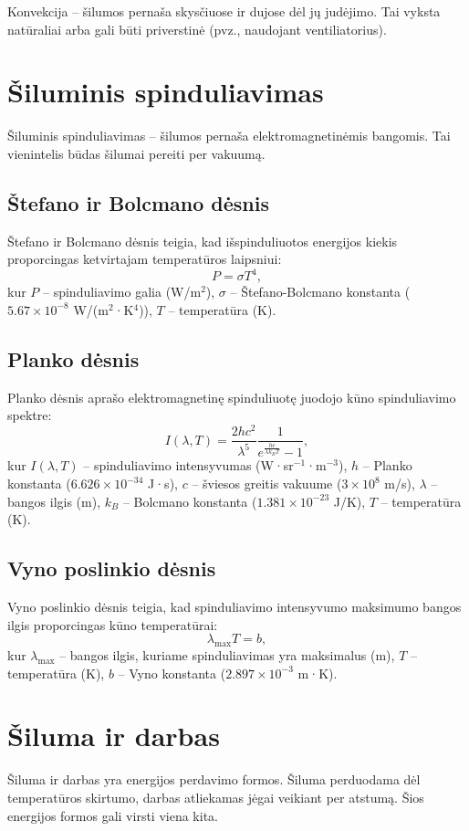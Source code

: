 \documentclass[a4paper,12pt]{article}
\begin{document}
Konvekcija – šilumos pernaša skysčiuose ir dujose dėl jų judėjimo. Tai vyksta natūraliai arba gali būti priverstinė (pvz., naudojant ventiliatorius).

\section{Šiluminis spinduliavimas}

Šiluminis spinduliavimas – šilumos pernaša elektromagnetinėmis bangomis. Tai vienintelis būdas šilumai pereiti per vakuumą.

\subsection{Štefano ir Bolcmano dėsnis}
Štefano ir Bolcmano dėsnis teigia, kad išspinduliuotos energijos kiekis proporcingas ketvirtajam temperatūros laipsniui:
\[
P = \sigma T^4,
\]
kur $P$ – spinduliavimo galia (W/m\(^2\)), $\sigma$ – Štefano-Bolcmano konstanta ($5.67 \times 10^{-8}$ W/(m\(^2\)·K\(^4\))), $T$ – temperatūra (K).

\subsection{Planko dėsnis}
Planko dėsnis aprašo elektromagnetinę spinduliuotę juodojo kūno spinduliavimo spektre:
\[
I(\lambda, T) = \frac{2hc^2}{\lambda^5} \frac{1}{e^{\frac{hc}{\lambda k_B T}} - 1},
\]
kur $I(\lambda, T)$ – spinduliavimo intensyvumas (W·sr\(^{-1}\)·m\(^{-3}\)), $h$ – Planko konstanta ($6.626 \times 10^{-34}$ J·s), $c$ – šviesos greitis vakuume ($3 \times 10^8$ m/s), $\lambda$ – bangos ilgis (m), $k_B$ – Bolcmano konstanta ($1.381 \times 10^{-23}$ J/K), $T$ – temperatūra (K).

\subsection{Vyno poslinkio dėsnis}
Vyno poslinkio dėsnis teigia, kad spinduliavimo intensyvumo maksimumo bangos ilgis proporcingas kūno temperatūrai:
\[
\lambda_{\text{max}} T = b,
\]
kur $\lambda_{\text{max}}$ – bangos ilgis, kuriame spinduliavimas yra maksimalus (m), $T$ – temperatūra (K), $b$ – Vyno konstanta ($2.897 \times 10^{-3}$ m·K).

\section{Šiluma ir darbas}

Šiluma ir darbas yra energijos perdavimo formos. Šiluma perduodama dėl temperatūros skirtumo, darbas atliekamas jėgai veikiant per atstumą. Šios energijos formos gali virsti viena kita.
\end{document}
